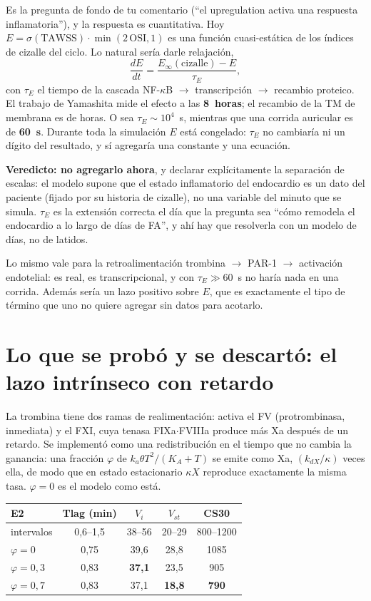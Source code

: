 \documentclass[11pt,a4paper]{article}
\begin{document}
Es la pregunta de fondo de tu comentario (``el upregulation activa una respuesta
inflamatoria''), y la respuesta es cuantitativa. Hoy $E=\sigma(\mathrm{TAWSS})\cdot
\min(2\,\mathrm{OSI},1)$ es una función cuasi-estática de los índices de cizalle del
ciclo. Lo natural sería darle relajación,
%
\begin{equation}
\frac{dE}{dt}=\frac{E_\infty(\text{cizalle})-E}{\tau_E},
\end{equation}
%
con $\tau_E$ el tiempo de la cascada NF-$\kappa$B $\to$ transcripción $\to$ recambio
proteico. El trabajo de Yamashita mide el efecto a las \textbf{8~horas}; el recambio
de la TM de membrana es de horas. O sea $\tau_E\sim10^4$~s, mientras que una corrida
auricular es de \textbf{60~s}. Durante toda la simulación $E$ está congelado:
$\tau_E$ no cambiaría ni un dígito del resultado, y sí agregaría una constante y una
ecuación.

\textbf{Veredicto: no agregarlo ahora}, y declarar explícitamente la separación de
escalas: el modelo supone que el estado inflamatorio del endocardio es un dato del
paciente (fijado por su historia de cizalle), no una variable del minuto que se
simula. $\tau_E$ es la extensión correcta el día que la pregunta sea ``cómo remodela
el endocardio a lo largo de días de FA'', y ahí hay que resolverla con un modelo de
días, no de latidos.

Lo mismo vale para la retroalimentación trombina $\to$ PAR-1 $\to$ activación
endotelial: es real, es transcripcional, y con $\tau_E\gg60$~s no haría nada en una
corrida. Además sería un lazo positivo sobre $E$, que es exactamente el tipo de
término que uno no quiere agregar sin datos para acotarlo.

\section{Lo que se probó y se descartó: el lazo intrínseco con retardo}

La trombina tiene dos ramas de realimentación: activa el FV (protrombinasa,
inmediata) y el FXI, cuya tenasa FIXa$\cdot$FVIIIa produce más Xa después de un
retardo. Se implementó como una redistribución en el tiempo que no cambia la
ganancia: una fracción $\varphi$ de $k_a\theta T^2/(K_A+T)$ se emite como Xa,
$(k_{dX}/\kappa)$ veces ella, de modo que en estado estacionario $\kappa X$
reproduce exactamente la misma tasa. $\varphi=0$ es el modelo como está.

\begin{center}
\small
\begin{tabular}{@{}lcccc@{}}
\toprule
E2 & Tlag (min) & $V_i$ & $V_{st}$ & CS30 \\
\midrule
intervalos & 0{,}6--1{,}5 & 38--56 & 20--29 & 800--1200 \\
$\varphi=0$ & 0{,}75 & 39{,}6 & 28{,}8 & 1085 \\
$\varphi=0{,}3$ & 0{,}83 & \textbf{37{,}1} & 23{,}5 & 905 \\
$\varphi=0{,}7$ & 0{,}83 & 37{,}1 & \textbf{18{,}8} & \textbf{790} \\
\bottomrule
\end{tabular}
\end{center}
\end{document}
